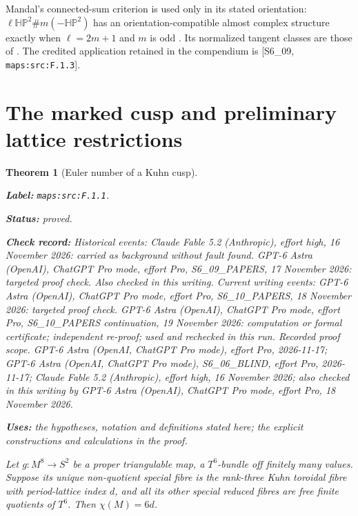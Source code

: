 \documentclass[11pt,a4paper]{article}
\newtheorem{theorem}{Theorem}[section]
\theoremstyle{definition}
\newcommand{\StatementRecord}[4]{\par\smallskip\begingroup\upshape\raggedright\noindent\textbf{Label:} \nolinkurl{#1}.\par\noindent\textbf{Status:} #2.\par\noindent\textbf{Check record:} #3.\par\noindent\textbf{Uses:} #4.\par\endgroup\smallskip}
\begin{document}
Mandal's connected-sum criterion is used only in its stated
orientation: $\ell\mathbb{HP}^2\#m(-\mathbb{HP}^2)$ has an
orientation-compatible almost complex structure exactly when
$\ell=2m+1$ and $m$ is odd
\cite[Corollary 1.4, p.~4, and its proof in \S5]{ffMandal}.
Its normalized tangent classes are those of
\cite[Lemma 2.1, p.~5, and Theorem 2.4, p.~7]{ffMandal}.
The credited application retained in the compendium is
[S6\_09, \nolinkurl{maps:src:F.1.3}].


\section{The marked cusp and preliminary lattice restrictions}



\begin{theorem}[Euler number of a Kuhn cusp]\label{maps:src:F.1.1}
\StatementRecord{maps:src:F.1.1}{proved}{Historical events: Claude Fable 5.2 (Anthropic), effort high, 16 November 2026: carried as background without fault found. GPT-6 Astra (OpenAI), ChatGPT Pro mode, effort Pro, S6\_09\_PAPERS, 17 November 2026: targeted proof check. Also checked in this writing. Current writing events: GPT-6 Astra (OpenAI), ChatGPT Pro mode, effort Pro, S6\_10\_PAPERS, 18 November 2026: targeted proof check. GPT-6 Astra (OpenAI), ChatGPT Pro mode, effort Pro, S6\_10\_PAPERS continuation, 19 November 2026: computation or formal certificate; independent re-proof; used and rechecked in this run. \emph{Recorded proof scope.} GPT-6 Astra (OpenAI, ChatGPT Pro mode), effort Pro, 2026-11-17; GPT-6 Astra (OpenAI, ChatGPT Pro mode), S6\_06\_BLIND, effort Pro, 2026-11-17; Claude Fable 5.2 (Anthropic), effort high, 16 November 2026; also checked in this writing by GPT-6 Astra (OpenAI), ChatGPT Pro mode, effort Pro, 18 November 2026}{the hypotheses, notation and definitions stated here; the explicit constructions and calculations in the proof}


Let $g:M^8\to S^2$ be a proper triangulable map, a $T^6$-bundle
off finitely many values.  Suppose its unique non-quotient special
fibre is the rank-three Kuhn toroidal fibre with period-lattice
index $d$, and all its other special reduced fibres are free
finite quotients of $T^6$.  Then $\chi(M)=6d$.

\end{theorem}
\end{document}
